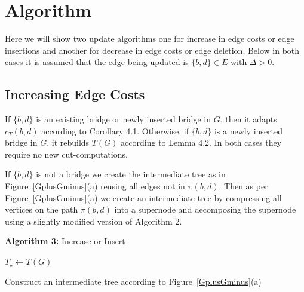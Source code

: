     \section{Algorithm}
    Here we will show two update algorithms one for increase in edge costs or edge insertions and another for decrease in edge costs or edge deletion. Below in both cases it is assumed that the edge being updated is $\{b,d\}\in E$ with $\Delta >0$.

    \subsection{Increasing Edge Costs}
    If $\{b,d\}$ is an existing bridge or newly inserted bridge in $G$, then it adapts $c_T (b,d)$ according to Corollary 4.1.
    Otherwise, if $\{b,d\}$ is a newly inserted bridge in $G$, it rebuilds $T(G)$ according to Lemma 4.2. In both cases they require no new cut-computations.

    If $\{b,d\}$ is not a bridge we create the intermediate tree as in Figure~\ref{GplusGminus}(a) reusing all edges not in $\pi (b,d)$. Then as per Figure~\ref{GplusGminus}(a) we create an intermediate tree by compressing all vertices on the path $\pi (b,d)$ into a supernode and decomposing the supernode using a slightly modified version of Algorithm 2.

    \begin{algorithm}[H]
    \hrulefill
    
    \textbf{Algorithm 3:} Increase or Insert
    
    \hrulefill
    \vspace{2mm}
    
    \DontPrintSemicolon
    
    
    $T_{\star} \gets T(G)$\;
    
    Construct an intermediate tree according to Figure~\ref{GplusGminus}(a)\;
    
    \;
    
    \vspace{2mm}
    \hrulefill
    \end{algorithm}


